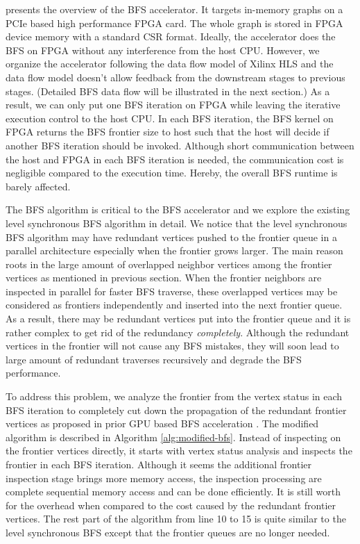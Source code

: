 presents the overview of 
the BFS accelerator. It targets in-memory graphs on a PCIe based 
high performance FPGA card. The whole graph is stored in FPGA device 
memory with a standard CSR format. 
Ideally, the accelerator does the BFS on FPGA without 
any interference from the host CPU. However, we organize the accelerator 
following the data flow model of Xilinx HLS and the data flow model 
doesn't allow feedback from the downstream stages to previous stages.
(Detailed BFS data flow will be illustrated in the next section.)
As a result, we can only put one BFS iteration on FPGA while 
leaving the iterative execution control to the host CPU. In each BFS iteration, 
the BFS kernel on FPGA returns the BFS frontier size to host such that the host will 
decide if another BFS iteration should be invoked. Although short communication 
between the host and FPGA in each BFS iteration is needed, the communication cost 
is negligible compared to the execution time. Hereby, 
the overall BFS runtime is barely affected.

The BFS algorithm is critical to the BFS accelerator and we explore the 
existing level synchronous BFS algorithm in detail. We notice that 
the level synchronous BFS algorithm may have redundant vertices pushed to the 
frontier queue in a parallel architecture especially when the frontier grows larger.
The main reason roots in the large amount of overlapped neighbor vertices among the 
frontier vertices as mentioned in previous section. When the frontier neighbors 
are inspected in parallel for faster BFS traverse, these overlapped vertices may be 
considered as frontiers independently and inserted into the next frontier queue. 
As a result, there may be redundant vertices put into the frontier queue and it is 
rather complex to get rid of the redundancy \textit{completely}. Although the redundant 
vertices in the frontier will not cause any BFS mistakes, they will soon lead to large 
amount of redundant traverses recursively and degrade the BFS performance.

To address this problem, we analyze the frontier from the 
vertex status in each BFS iteration to completely cut down the 
propagation of the redundant frontier vertices as proposed in prior 
GPU based BFS acceleration \cite{liu2015enterprise}. The modified algorithm is described 
in Algorithm \ref{alg:modified-bfs}. Instead of inspecting on the frontier vertices directly, 
it starts with vertex status analysis and inspects the frontier 
in each BFS iteration. Although it seems the additional frontier inspection stage 
brings more memory access, the inspection processing are complete sequential 
memory access and can be done efficiently. It is still worth for the overhead 
when compared to the cost caused by the redundant frontier vertices. 
The rest part of the algorithm from line 10 to 15 is 
quite similar to the level synchronous BFS except that the frontier queues 
are no longer needed.


